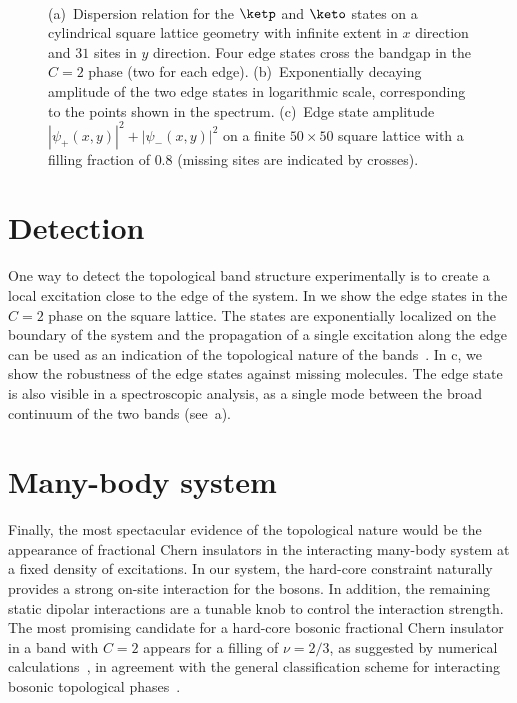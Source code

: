 \begin{figure}[ht]
    \centering
    \begin{minipage}[b]{.482\columnwidth}
         \\
        \vspace{2mm}
    \end{minipage}

    \caption{
        (a)~Dispersion relation for the $\ketp$ and $\keto$ states on a cylindrical square lattice geometry with infinite extent in $x$ direction and $31$ sites in $y$ direction.
        Four edge states cross the bandgap in the $C=2$ phase (two for each edge).
        (b)~Exponentially decaying amplitude of the two edge states in logarithmic scale, corresponding to the points shown in the spectrum.
        (c)~Edge state amplitude $|\psi_+(x,y)|^2 + |\psi_-(x,y)|^2$ on a finite $50 \times 50$ square lattice with a filling fraction of $0.8$ (missing sites are indicated by crosses).
    }
\end{figure}

\section{Detection}
One way to detect the topological band structure experimentally is to create a local excitation close to the edge of the system.
In  we show the edge states in the $C=2$ phase on the square lattice.
The states are exponentially localized on the boundary of the system and the propagation of a single excitation along the edge can be used as an indication of the topological nature of the bands~\cite{Hafezi2013}.
In c, we show the robustness of the edge states against missing molecules.
The edge state is also visible in a spectroscopic analysis, as a single mode between the broad continuum of the two bands (see~a).

\section{Many-body system}
Finally, the most spectacular evidence of the topological nature would be the appearance of fractional Chern insulators in the interacting many-body system at a fixed density of excitations.
In our system, the hard-core constraint naturally provides a strong on-site interaction for the bosons.
In addition, the remaining static dipolar interactions are a tunable knob to control the interaction strength.
The most promising candidate for a hard-core bosonic fractional Chern insulator in a band with $C=2$ appears for a filling of $\nu = 2/3$, as suggested by numerical calculations~\cite{Moller2009,Wang2012a}, in agreement with the general classification scheme for interacting bosonic topological phases~\cite{Lu2012a,Chen2013}.


